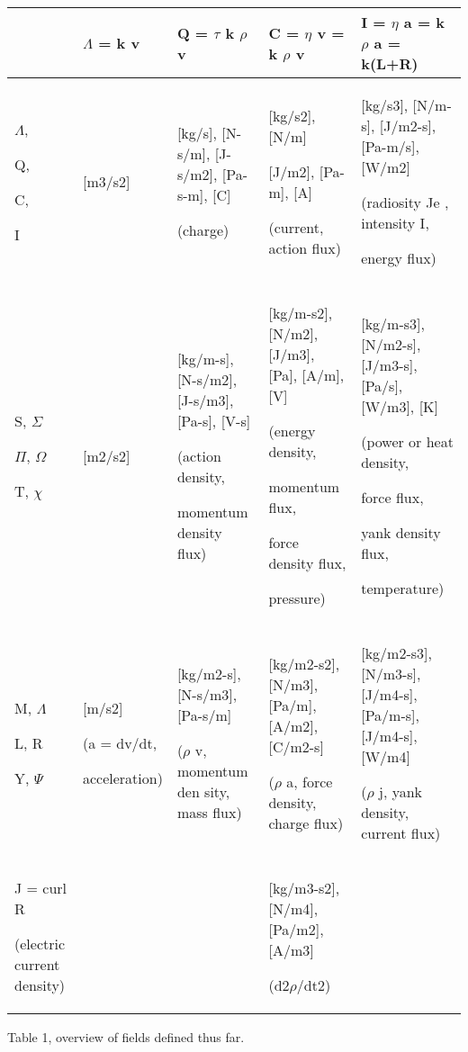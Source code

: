 \documentclass{article}
\begin{document}
\begin{flushleft}
\tablefirsthead{}
\tablehead{}
\tabletail{}
\tablelasttail{}
\begin{supertabular}{|m{1.737cm}|m{1.763cm}|m{3.698cm}|m{3.7cm}|m{4.0090003cm}|}
\hline
 &
$\Lambda $ =  k v &
Q =  $\tau $ k $\rho $ v &
C = $\eta $ v =  k $\rho $ v &
I = $\eta $ a = k $\rho $ a = k(L+R)\\\hline
$\Lambda $, 

Q, 

C, 

I &
[m3/s2]

 &
[kg/s], [N-s/m], [J-s/m2], [Pa-s-m], [C]

(charge) &
[kg/s2], [N/m]

[J/m2], [Pa-m], [A]

(current, action flux) &
[kg/s3], [N/m-s], [J/m2{}-s], [Pa-m/s], [W/m2] 

(radiosity Je , intensity I, 

energy flux)\\\hline
S,  $\Sigma $

$\Pi $, $\Omega $

T, $\chi $ &
[m2/s2] &
[kg/m-s], [N-s/m2], [J-s/m3], [Pa-s], [V-s]  

(action density,

momentum density flux) &
[kg/m-s2], [N/m2], [J/m3], [Pa], [A/m], [V]

(energy density,

momentum flux, 

force density flux, 

pressure) &
[kg/m-s3], [N/m2{}-s], [J/m3{}-s], [Pa/s], [W/m3], [K]

(power or heat density, 

force flux,

yank density flux, 

temperature)\\\hline
M, $\Lambda $

L, R

Y, $\Psi $ &
[m/s2]  

(a = dv/dt,

acceleration) &
[kg/m2{}-s], [N-s/m3], [Pa-s/m]  

($\rho $ v, momentum den sity, mass flux) &
[kg/m2{}-s2], [N/m3], [Pa/m], [A/m2], [C/m2{}-s]

($\rho $ a, force density, charge flux) &
[kg/m2{}-s3], [N/m3{}-s], [J/m4{}-s], [Pa/m-s], [J/m4{}-s], [W/m4]

($\rho $ j, yank density, current flux)\\\hline
J = curl R

(electric current density) &
 &
 &
[kg/m3{}-s2], [N/m4], [Pa/m2], [A/m3] 

(d2$\rho $/dt2) &
\\\hline
\end{supertabular}
\end{flushleft}
Table 1, overview of fields defined thus far.
\end{document}
